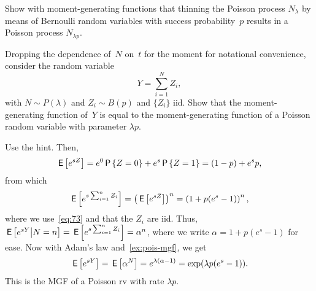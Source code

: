 \documentclass[stochastic-or.tex]{subfiles}
\begin{document}



\begin{exercise}\label{ex:1}
 Show with moment-generating functions that thinning the Poisson process $N_\lambda$ by means of Bernoulli random variables with success probability~$p$ results in a Poisson process $N_{\lambda p}$.
\begin{hint}
Dropping the dependence of~$N$ on~$t$ for the moment for notational convenience, consider the random variable
 \begin{equation*}
 Y = \sum_{i=1}^N Z_i,
 \end{equation*}
 with $N\sim P(\lambda)$ and $Z_i\sim B(p)$ and $\{Z_{i}\}$ iid.
Show that the moment-generating function of~$Y$ is equal to the moment-generating function of a Poisson random variable with parameter $\lambda p$.
\end{hint}
\begin{solution}

Use the hint. Then,
\begin{equation*}
 \,\mathsf{E}\left[e^{s Z}\right] = e^0 \,\mathsf{P}\left\{Z=0\right\} + e^{s} \,\mathsf{P}\left\{Z=1\right\} = (1-p) + e^s p,
\end{equation*}
from which
\begin{equation*}
\,\mathsf{E}\left[e^{s\sum_{i=1}^n Z_i}\right] = \left(\,\mathsf{E}\left[e^{s Z}\right]\right)^n = \left(1 + p (e^s - 1)\right)^n,
\end{equation*}
where we use~\cref{eq:73} and that the $Z_i$  are iid.
Thus, $\,\mathsf{E}\left[e^{sY}\big|N=n\right] = \,\mathsf{E}\left[e^{s\sum_{i=1}^n Z_i}\right] = \alpha^{n}$, where we write $\alpha =1 + p (e^s - 1)$ for ease.
Now with Adam's law and~\cref{ex:pois-mgf}, we get
\begin{equation*}
\,\mathsf{E}\left[e^{sY}\right] = \,\mathsf{E}\left[\alpha^{N}\right] = e^{\lambda (\alpha - 1)} = \exp(\lambda p (e^s - 1)).
\end{equation*}
This is the MGF of a Poisson rv with rate $\lambda p$.


\end{solution}
\end{exercise}
\end{document}
